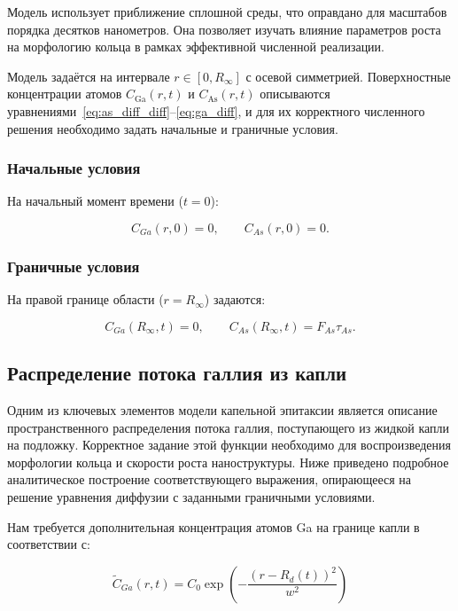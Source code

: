 \documentclass[14pt,oneside]{extarticle}
\begin{document}
Модель использует приближение сплошной среды, что оправдано для масштабов порядка десятков нанометров. Она позволяет изучать влияние параметров роста на морфологию кольца в рамках эффективной численной реализации.

Модель задаётся на интервале $r \in [0, R_\infty]$ с осевой симметрией. Поверхностные концентрации атомов $C_{\text{Ga}}(r,t)$ и $C_{\text{As}}(r,t)$ описываются уравнениями~\eqref{eq:as_diff_diff}–\eqref{eq:ga_diff}, и для их корректного численного решения необходимо задать начальные и граничные условия.

\subsubsection*{Начальные условия}

На начальный момент времени ($t = 0$): 

\begin{equation}
C_{Ga}\left(r,0\right)=0, \qquad
C_{As}\left(r,0\right)=0.
\end{equation}

\subsubsection*{Граничные условия}

На правой границе области ($r = R_\infty$) задаются:

\begin{equation}
C_{Ga}\left(R_{\infty},t\right)=0, \qquad
C_{As}\left(R_{\infty},t\right)=F_{As}\tau_{As}.
\end{equation}

\subsection{Распределение потока галлия из капли}

Одним из ключевых элементов модели капельной эпитаксии является описание пространственного распределения потока галлия, поступающего из жидкой капли на подложку. Корректное задание этой функции необходимо для воспроизведения морфологии кольца и скорости роста наноструктуры. Ниже приведено подробное аналитическое построение соответствующего выражения, опирающееся на решение уравнения диффузии с заданными граничными условиями.

Нам требуется дополнительная концентрация атомов Ga на границе капли в соответствии с:

\begin{equation}
\tilde{C}_{Ga}\left(r,t\right)=C_{0}\exp\left(-\frac{\left(r-R_{d}\left(t\right)\right)^{2}}{w^{2}}\right)
\end{equation}
\end{document}
